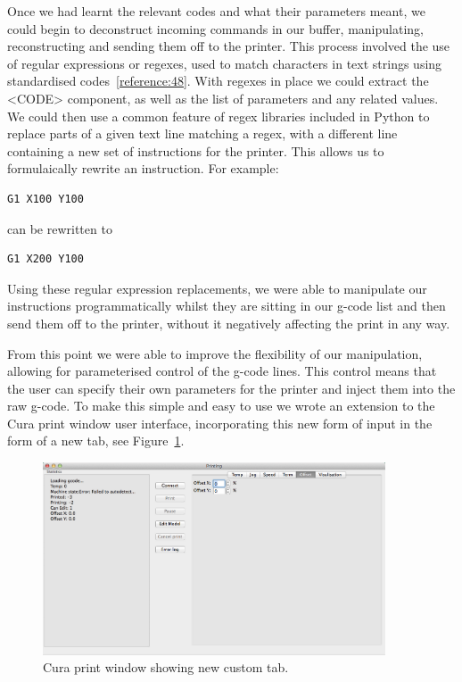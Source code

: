 \documentclass[11pt]{report} %
\begin{document}
Once we had learnt the relevant codes and what their parameters meant, we could begin to deconstruct incoming commands in our buffer, manipulating, reconstructing and sending them off to the printer. This process involved the use of regular expressions or regexes, used to match characters in text strings using standardised codes~\ref{reference:48}. With regexes in place we could extract the <CODE> component, as well as the list of parameters and any related values. We could then use a common feature of regex libraries included in Python to replace parts of a given text line matching a regex, with a different line containing a new set of instructions for the printer. This allows us to formulaically rewrite an instruction. For example:
\begin{verbatim}
G1 X100 Y100
\end{verbatim}
can be rewritten to
\begin{verbatim}
G1 X200 Y100
\end{verbatim}

Using these regular expression replacements, we were able to manipulate our instructions programmatically whilst they are sitting in our g-code list and then send them off to the printer, without it negatively affecting the print in any way.

	From this point we were able to improve the flexibility of our manipulation, allowing for parameterised control of the g-code lines. This control means that the user can specify their own parameters for the printer and inject them into the raw g-code. 
To make this simple and easy to use we wrote an extension to the Cura print window user interface, incorporating this new form of input in the form of a new tab, see Figure~\ref{figure:CuraCustomTab}.

\begin{figure}[H]
  \centering
  \includegraphics[width=4in]{CuraCustomTab.png}
  \caption{Cura print window showing new custom tab.}
  \label{figure:CuraCustomTab}
\end{figure}
\end{document}
